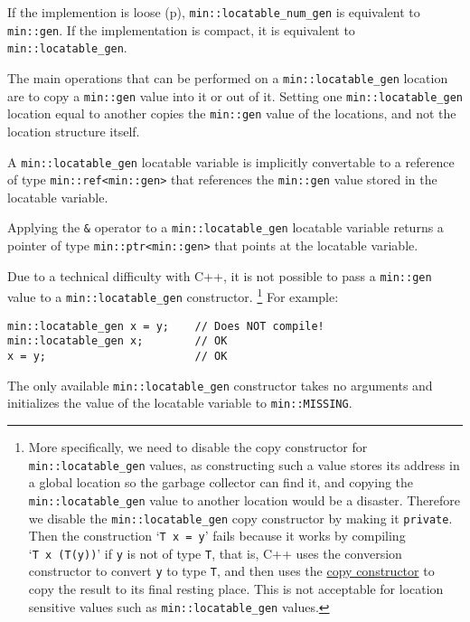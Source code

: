 \documentclass[12pt]{article}
\newcommand{\pagref}[1]{p\pageref{#1}}
\newcommand{\EOL}{\penalty \exhyphenpenalty}
\newenvironment{indpar}[1][0.3in]%
	{\begin{list}{}%
		     {\setlength{\itemsep}{0in}%
		      \setlength{\topsep}{0in}%
		      \setlength{\parsep}{1ex}%
		      \setlength{\labelwidth}{#1}%
		      \setlength{\leftmargin}{#1}%
		      \addtolength{\leftmargin}{\labelsep}}%
	 \item}%
	{\end{list}}
\begin{document}
If the implemention is loose (\pagref{LOOSE}),
{\tt min::locatable\_\EOL num\_\EOL gen} is equivalent to
{\tt min::gen}.  If the implementation is compact, it is equivalent to
{\tt min::locatable\_\EOL gen}.

The main operations that can be performed on a
{\tt min::locatable\_\EOL gen} location are to copy a {\tt min::gen}
value into it or out of it.  Setting one {\tt min::\EOL locatable\_\EOL gen}
location equal to another copies the {\tt min::gen} value of the locations,
and not the location structure itself.

A {\tt min::\EOL locatable\_\EOL gen} locatable variable
is implicitly convertable to a
reference
of type {\tt min::\EOL ref<min::gen>}
that references the {\tt min::gen}
value stored in the locatable variable.

Applying the {\tt \&} operator to a
{\tt min::\EOL locatable\_\EOL gen} locatable variable
returns a pointer of type {\tt min::\EOL ptr<min::gen>} that points
at the locatable variable.

Due to a technical difficulty with C++, it is not possible to pass a
{\tt min::gen} value to a {\tt min::\EOL locatable\_\EOL gen} constructor.%
%
\footnote{\label{LOCATABLE-VAR-COPY-FOOTNOTE}
More specifically, we need to disable the copy constructor
for {\tt min::\EOL locatable\_\EOL gen} values, as constructing such a
value stores its address in a global location so the garbage collector
can find it, and copying the {\tt min::\EOL locatable\_\EOL gen} value
to another location would be a disaster.  Therefore we disable the
{\tt min::\EOL locatable\_\EOL gen}
copy constructor by making it {\tt private}.
Then the construction `{\tt T~x~=~y}' fails because it works
by compiling `{\tt T~x~(T(y))}' if {\tt y} is not of type {\tt T},
that is, C++ uses the conversion constructor to convert {\tt y}
to type {\tt T}, and then uses the \underline{copy constructor}
to copy the result to its final resting place.  This is not acceptable for
location sensitive values such as
{\tt min::\EOL locatable\_\EOL gen} values.}
%
For example:

\begin{indpar}\begin{verbatim}
min::locatable_gen x = y;    // Does NOT compile!
min::locatable_gen x;        // OK
x = y;                       // OK
\end{verbatim}\end{indpar}

The only available {\tt min::locatable\_gen} constructor takes
no arguments and initializes the value of the locatable variable
to {\tt min::\EOL MISSING}.
\end{document}
